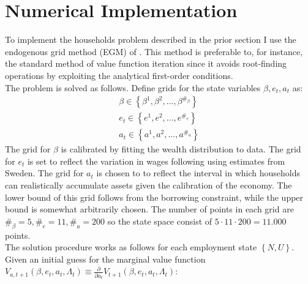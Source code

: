 \section{Numerical Implementation}
To implement the households problem described in the prior section I use the endogenous grid method (EGM) of \citet{carroll2006method}. This method is preferable to, for instance, the standard method of value function iteration since it avoids root-finding operations by exploiting the analytical first-order conditions.  \\
The problem is solved as follows. Define grids for the state variables $\beta,e_{t},a_{t}$ as:
\begin{gather*}
\beta\in\left\{ \beta^{1},\beta^{2},...,\beta^{\#_{\beta}}\right\}  \\
e_{t}\in\left\{ e^{1},e^{2},...,e^{\#_{e}}\right\}  \\
a_{t}\in\left\{ a^{1},a^{2},...,a^{\#_{a}}\right\} 
\end{gather*}
The grid for $\beta$ is calibrated by fitting the wealth distribution to data. The grid for $e_t$ is set to reflect the variation in wages following \citet{floden2001idiosyncratic} using estimates from Sweden. The grid for $a_t$ is chosen to to reflect the interval in which households can realistically accumulate assets given the calibration of the economy. The lower bound of this grid follows from the borrowing constraint, while the upper bound is somewhat arbitrarily chosen. The number of points in each grid are $\#_{\beta}=5,\#_{e}=11,\#_{a}=200$ so the state space consist of $5\cdot11\cdot200=11.000$ points.   \\
The solution procedure works as follows for each employment state $\left\{ N,U\right\}$. Given an initial guess for the marginal value function $V_{a,t+1}\left(\beta,e_{t},a_{t},\Lambda_{t}\right)\equiv\frac{\partial}{\partial a_{t}}V_{t+1}\left(\beta,e_{t},a_{t},\Lambda_{t}\right)$:
